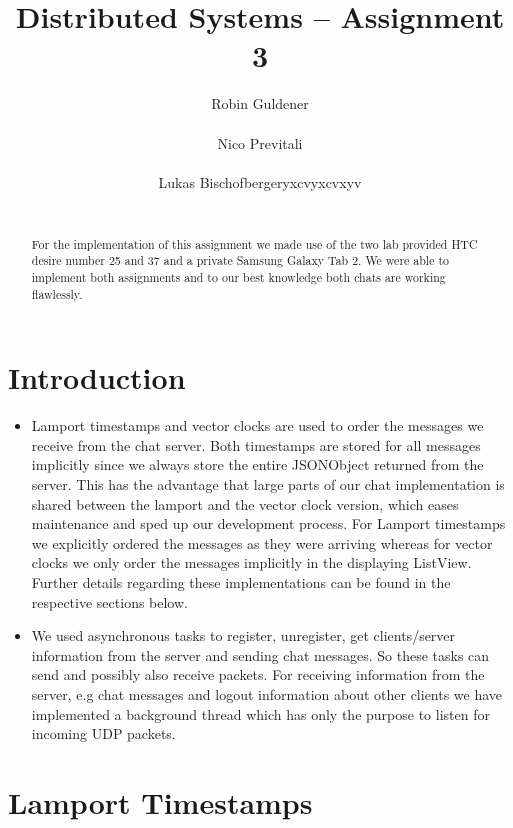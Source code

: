\documentclass{report}
\title{Distributed Systems -- Assignment 3}
\author{
%
%
\alignauthor Robin Guldener\\
	\affaddr{ETH ID 11-930-369}\\
	\email{robing@student.ethz.ch}
\alignauthor Nico Previtali\\
	\affaddr{ETH ID 11-926-433}\\
	\email{pnico@student.ethz.ch}
\alignauthor Lukas Bischofbergeryxcvyxcvxyv\\
	\affaddr{ETH ID 11-915-907}\\
	\email{lukasbi@student.ethz.ch}
}
\begin{document}
\maketitle

\begin{abstract}
For the implementation of this assignment we made use of the two lab provided HTC desire number 25 and 37 and a private Samsung Galaxy Tab 2. We were able to implement both assignments and to our best knowledge both chats are working flawlessly. 
\end{abstract}

\section{Introduction}

\begin{itemize}
  \item Lamport timestamps\cite{lamport} and vector clocks\cite{vector_clocks} are used to order the messages we receive from the chat server. Both timestamps are stored for all messages implicitly since we always store the entire JSONObject returned from the server. This has the advantage that large parts of our chat implementation is shared between the lamport and the vector clock version, which eases maintenance and sped up our development process. For Lamport timestamps we explicitly ordered the messages as they were arriving whereas for vector clocks we only order the messages implicitly in the displaying ListView. Further details regarding these implementations can be found in the respective sections below.%
  \item %
  We used asynchronous tasks to register, unregister, get clients/server information from the server and sending chat messages. So these tasks can send and possibly also receive packets. For receiving information from the server, e.g chat messages and logout information about other clients we have implemented a background thread which has only the purpose to listen for incoming UDP packets. 
\end{itemize}

\section{Lamport Timestamps}
\end{document}
